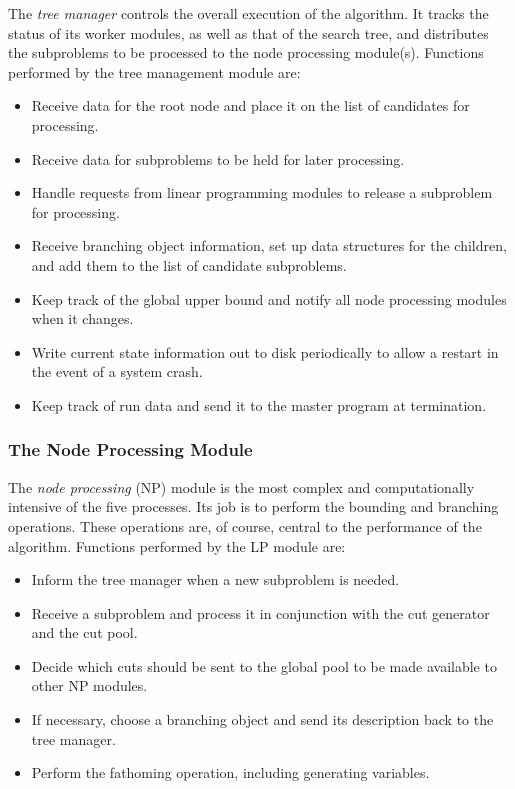 The \emph{tree manager} controls the overall execution of the algorithm. It
tracks the status of its worker modules, as well as that of the search
tree, and distributes the subproblems to be processed to the node processing
module(s). Functions performed by the tree management module are:
\begin{itemize}
        \item Receive data for the root node and place it on the list 
        of candidates for processing.
        \item Receive data for subproblems to be held for later
        processing.
        \item Handle requests from linear programming modules to
        release a subproblem for processing.
        \item Receive branching object information, set up data structures
        for the children, and add them to the list of candidate subproblems.
        \item Keep track of the global upper bound and notify all node
        processing modules when it changes.
        \item Write current state information out to disk periodically
        to allow a restart in the event of a system crash.
        \item Keep track of run data and send it to the master
        program at termination.
\end{itemize} 

\subsubsection{The Node Processing Module}

The \emph{node processing} (NP) module is the most complex and
computationally intensive of the five processes. Its job is to perform
the bounding and branching operations. These operations
are, of course, central to the performance of the algorithm. Functions
performed by the LP module are:
\begin{itemize}
        \item Inform the tree manager when a new subproblem is needed.
        \item Receive a subproblem and process it in conjunction
        with the cut generator and the cut pool.
        \item Decide which cuts should be sent to the global pool to
        be made available to other NP modules.
        \item If necessary, choose a branching object and send its
        description back to the tree manager.
        \item Perform the fathoming operation, including generating
        variables. 
\end{itemize} 

